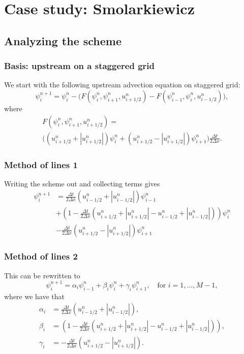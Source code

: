 \documentclass[hyperref={pdfstartview=Fit}]{beamer}
\providecommand{\abs}[1]{\left\lvert#1\right\rvert}
\begin{document}
\section{Case study: Smolarkiewicz}
\subsection{Analyzing the scheme}

\begin{frame}
\frametitle{Basis: upstream on a staggered grid}
We start with the following upstream advection equation on staggered grid:
\begin{equation*}
 \psi_i^{n+1} = \psi_i^n - \Big( F \left( \psi_i^n,\psi_{i+1}^n,u_{i+1/2}^n\right)
-F \left( \psi_{i-1}^n,\psi_{i}^n,u_{i-1/2}^n\right) \Big),
\end{equation*}
where
\begin{multline*}
F \left( \psi_i^n,\psi_{i+1}^n,u_{i+1/2}^n\right) =\\
\Big( \left( u_{i+1/2}^n + \abs{u_{i+1/2}^n} \right) \psi_i^n
+ \left( u_{i+1/2}^n - \abs{u_{i+1/2}^n} \right) \psi_{i+1}^n \Big)
\frac{\Delta t}{2 \Delta x}.
\end{multline*}
\end{frame}

\begin{frame}
\frametitle{Method of lines 1}
Writing the scheme out and collecting terms gives
\begin{equation*}
\begin{split}
\psi_i^{n+1} &=
\frac{\Delta t}{2 \Delta x} \left( u_{i-1/2}^n + \abs{u_{i-1/2}^n} \right) \psi_{i-1}^n\\
&+ \left(1 - \frac{\Delta t}{2 \Delta x} \left( u_{i+1/2}^n + \abs{u_{i+1/2}^n} - u_{i-1/2}^n + \abs{u_{i-1/2}^n} \right) \right) \psi_i^n\\
&-\frac{\Delta t}{2 \Delta x} \left( u_{i+1/2}^n - \abs{u_{i+1/2}^n} \right) \psi_{i+1}^n
\end{split}
\end{equation*}
\end{frame}

\begin{frame}
\frametitle{Method of lines 2}
This can be rewritten to 
\begin{equation*}
\psi_i^{n+1} = \alpha_i \psi_{i-1}^n + \beta_i \psi_i^n +\gamma_i \psi_{i+1}^n, \quad \text{for } i=1,\ldots,M-1,
\end{equation*}
 where we have that
\begin{align*}
\alpha_i &= \frac{\Delta t}{2 \Delta x} \left( u_{i-1/2}^n + \abs{u_{i-1/2}^n} \right),\\
 \beta_i &= \left(1 - \frac{\Delta t}{2 \Delta x} \left( u_{i+1/2}^n + \abs{u_{i+1/2}^n} - u_{i-1/2}^n + \abs{u_{i-1/2}^n} \right) \right),\\
\gamma_i &= -\frac{\Delta t}{2 \Delta x} \left( u_{i+1/2}^n - \abs{u_{i+1/2}^n} \right).
\end{align*}
\end{frame}
\end{document}
